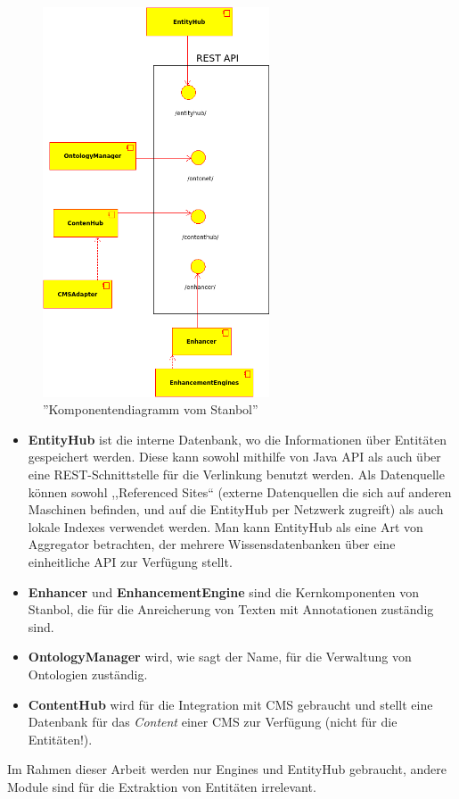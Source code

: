 \begin{figure}[ht]
\centering
\includegraphics[width=0.6\textwidth]{Bilder/komponenten.png}
\caption{''Komponentendiagramm vom Stanbol''}
\label{fig:komponenten}
\end{figure}

\begin{itemize}
\item \textbf{EntityHub} ist die interne Datenbank, wo die Informationen über Entitäten gespeichert werden. Diese kann sowohl mithilfe von Java API als auch über eine REST-Schnittstelle für die Verlinkung benutzt werden. Als Datenquelle können sowohl ,,Referenced Sites`` (externe Datenquellen die sich auf anderen Maschinen befinden, und auf die EntityHub per Netzwerk zugreift) als auch lokale Indexes verwendet werden. Man kann EntityHub als eine Art von Aggregator betrachten, der mehrere Wissensdatenbanken über eine einheitliche API zur Verfügung stellt. 
\item \textbf{Enhancer} und \textbf{EnhancementEngine} sind die Kernkomponenten von Stanbol, die für die Anreicherung von Texten mit Annotationen zuständig sind.
\item \textbf{OntologyManager} wird, wie sagt der Name, für die Verwaltung von Ontologien zuständig.
\item \textbf{ContentHub} wird für die Integration mit CMS gebraucht und stellt eine Datenbank für das \textit{Content} einer CMS zur Verfügung (nicht für die Entitäten!).
\end{itemize}
Im Rahmen dieser Arbeit werden nur Engines und EntityHub gebraucht, andere Module sind für die Extraktion von Entitäten irrelevant.


